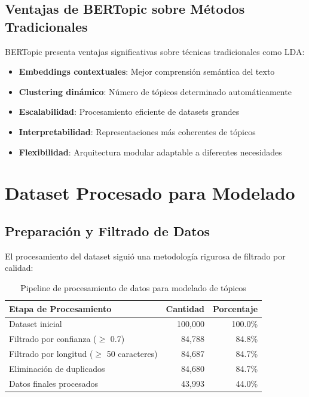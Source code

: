 \documentclass[12pt,a4paper,twoside,openany]{book}
\begin{document}
\subsection{Ventajas de BERTopic sobre Métodos Tradicionales}

BERTopic presenta ventajas significativas sobre técnicas tradicionales como LDA:

\begin{itemize}
    \item \textbf{Embeddings contextuales}: Mejor comprensión semántica del texto
    \item \textbf{Clustering dinámico}: Número de tópicos determinado automáticamente
    \item \textbf{Escalabilidad}: Procesamiento eficiente de datasets grandes
    \item \textbf{Interpretabilidad}: Representaciones más coherentes de tópicos
    \item \textbf{Flexibilidad}: Arquitectura modular adaptable a diferentes necesidades
\end{itemize}

\section{Dataset Procesado para Modelado}

\subsection{Preparación y Filtrado de Datos}

El procesamiento del dataset siguió una metodología rigurosa de filtrado por calidad:

\begin{table}[H]
\centering
\caption{Pipeline de procesamiento de datos para modelado de tópicos}
\begin{tabular}{@{}lrr@{}}
\toprule
\textbf{Etapa de Procesamiento} & \textbf{Cantidad} & \textbf{Porcentaje} \\
\midrule
Dataset inicial & 100,000 & 100.0\% \\
Filtrado por confianza ($\geq$ 0.7) & 84,788 & 84.8\% \\
Filtrado por longitud ($\geq$ 50 caracteres) & 84,687 & 84.7\% \\
Eliminación de duplicados & 84,680 & 84.7\% \\
Datos finales procesados & 43,993 & 44.0\% \\
\bottomrule
\end{tabular}
\end{table}
\end{document}
